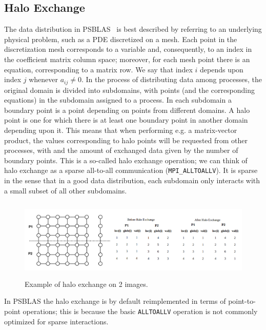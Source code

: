 \documentclass{IOS-Book-Article}
\begin{document}
\subsection{Halo Exchange}

The data distribution in  PSBLAS~\cite{PSBLAS} is best described by
referring to an underlying physical problem, such as a PDE discretized
on a mesh.
Each point in the discretization mesh corresponds to a variable and,
consequently, to an index in the coefficient matrix column space;
moreover, for each mesh point there is an equation, corresponding to a
matrix row. We say that index $i$ depends upon index $j$ whenever $a_{ij}\neq0$.  
In the process of distributing data among processes, the original
domain is divided into subdomains, with points (and the corresponding
equations) in the subdomain assigned to a process.  In each subdomain
a boundary point is a point depending on points from different domains. A halo point
is one for which there is at least one boundary point in another
domain depending upon it.  
This means that when performing e.g. a matrix-vector product, the
values corresponding to halo points will be requested from other
processes, with and the amount of exchanged data given by the number 
of boundary points.   This is a so-called halo exchange 
operation; we can think of halo exchange as a sparse all-to-all
communication (\verb|MPI_ALLTOALLV|). It is sparse in the  sense that
in a good data distribution, each subdomain only interacts with a
small subset of all other subdomains. 
\begin{figure}
\includegraphics[height=1.5in, width=4.65in]{halo2.png}
\caption{Example of halo exchange on 2 images. }
\end{figure}
In  PSBLAS the halo exchange is by default reimplemented in terms of
point-to-point operations; this is because the basic 
\verb|ALLTOALLV| operation is not commonly optimized for sparse interactions.
\end{document}
